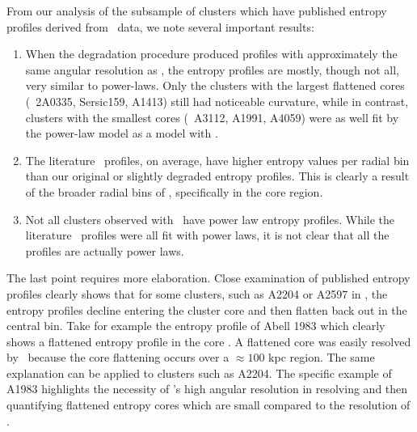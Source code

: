 \documentclass{emulateapj}
\begin{document}
From our analysis of the subsample of clusters which have published
entropy profiles derived from \xmm\ data, we note several important
results:
\begin{enumerate}
\item When the degradation procedure produced profiles with
  approximately the same angular resolution as \xmm, the entropy
  profiles are mostly, though not all, very similar to
  power-laws. Only the clusters with the largest flattened cores
  (\eg\ 2A0335, Sersic159, A1413) still had noticeable curvature,
  while in contrast, clusters with the smallest cores (\eg\ A3112,
  A1991, A4059) were as well fit by the power-law model as a model
  with \kna.
\item The literature \xmm\ profiles, on average, have higher entropy
  values per radial bin than our original or slightly degraded
  entropy profiles. This is clearly a result of the broader radial
  bins of \xmm, specifically in the core region.
\item Not all clusters observed with \xmm\ have power law entropy
  profiles. While the literature \xmm\ profiles were all fit with
  power laws, it is not clear that all the profiles are actually power
  laws.
\end{enumerate}
The last point requires more elaboration. Close examination of
published entropy profiles clearly shows that for some clusters, such
as A2204 or A2597 in \citet{pratt06}, the entropy profiles decline
entering the cluster core and then flatten back out in the central
bin. Take for example the entropy profile of Abell 1983 which clearly
shows a flattened entropy profile in the core
\citep{2003A&A...408....1P}. A flattened core was easily resolved by
\xmm\ because the core flattening occurs over a $\approx 100$ kpc
region. The same explanation can be applied to clusters such as
A2204. The specific example of A1983 highlights the necessity of
\chandra's high angular resolution in resolving and then quantifying
flattened entropy cores which are small compared to the resolution of
\xmm.

\end{document}
